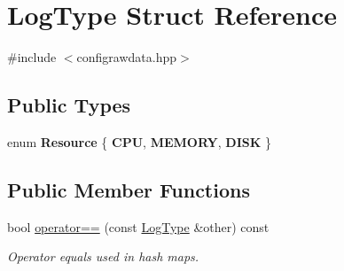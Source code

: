 \hypertarget{structLogType}{}\section{Log\+Type Struct Reference}
\label{structLogType}


{\ttfamily \#include $<$configrawdata.\+hpp$>$}

\subsection*{Public Types}
\begin{DoxyCompactItemize}
\item 
enum {\bfseries Resource} \{ {\bfseries C\+PU}, 
{\bfseries M\+E\+M\+O\+RY}, 
{\bfseries D\+I\+SK}
 \}\hypertarget{structLogType_ac6cea1cba3245687b1530b938aed6f3b}{}\label{structLogType_ac6cea1cba3245687b1530b938aed6f3b}

\end{DoxyCompactItemize}
\subsection*{Public Member Functions}
\begin{DoxyCompactItemize}
\item 
bool \hyperlink{structLogType_a19312744ae4df2559e3b548fff00e686}{operator==} (const \hyperlink{structLogType}{Log\+Type} \&other) const \hypertarget{structLogType_a19312744ae4df2559e3b548fff00e686}{}\label{structLogType_a19312744ae4df2559e3b548fff00e686}

\begin{DoxyCompactList}\small\item\em Operator equals used in hash maps. \end{DoxyCompactList}\end{DoxyCompactItemize}
